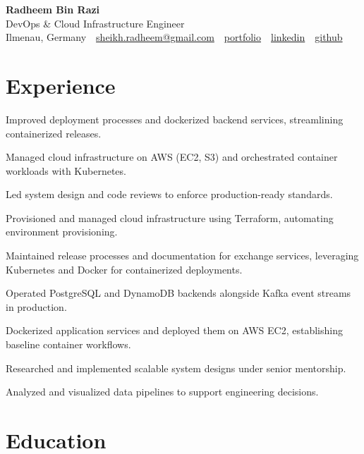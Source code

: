 \documentclass[11pt,a4paper]{resume}
\makeatletter
\newcommand{\Portfolio}{https://radheem.github.io/my-cv}
\newcommand{\PortfolioText}{portfolio}
\newcommand{\GitHub}{https://github.com/radheem}
\newcommand{\LinkedIn}{https://www.linkedin.com/in/radheem-razi}
\newcommand{\Email}{sheikh.radheem@gmail.com}
\makeatother
\begin{document}
\begin{center}
  {\huge\bfseries Radheem Bin Razi}\\[3pt]
  {\large DevOps \& Cloud Infrastructure Engineer}\\[6pt]
  \small
  Ilmenau, Germany \,\textbar\,
  \href{mailto:\Email}{\Email} \,\textbar\,
  \href{\Portfolio}{\PortfolioText} \,\textbar\,
  \href{\LinkedIn}{linkedin} \,\textbar\,
  \href{\GitHub}{github}
\end{center}
\vspace{2pt}

\section{Experience}

\bullets
  \item Improved deployment processes and dockerized backend services, streamlining containerized releases.
  \item Managed cloud infrastructure on AWS (EC2, S3) and orchestrated container workloads with Kubernetes.
  \item Led system design and code reviews to enforce production-ready standards.
\bulletsend
\vspace{3pt}
\bullets
  \item Provisioned and managed cloud infrastructure using Terraform, automating environment provisioning.
  \item Maintained release processes and documentation for exchange services, leveraging Kubernetes and Docker for containerized deployments.
  \item Operated PostgreSQL and DynamoDB backends alongside Kafka event streams in production.
\bulletsend
\vspace{3pt}
\bullets
  \item Dockerized application services and deployed them on AWS EC2, establishing baseline container workflows.
  \item Researched and implemented scalable system designs under senior mentorship.
  \item Analyzed and visualized data pipelines to support engineering decisions.
\bulletsend
\vspace{3pt}

\section{Education}
\end{document}
